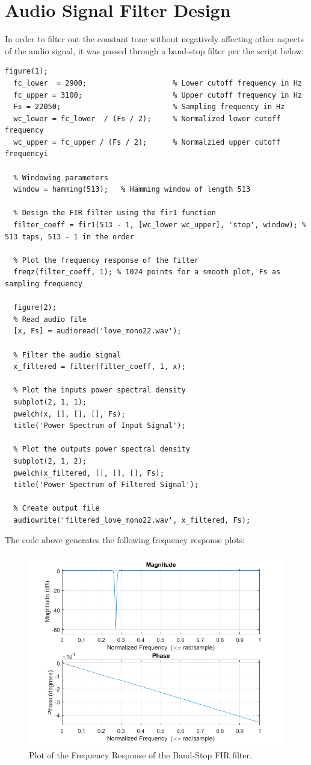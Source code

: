 \documentclass[a4paper, 10pt]{article}
\begin{document}
\section{Audio Signal Filter Design}
In order to filter out the constant tone without negatively affecting other aspects of the audio signal, it was passed through
a band-stop filter per the script below:
\begin{lstlisting}[style=Matlab-editor, basicstyle=\small\ttfamily]
  figure(1);
  fc_lower  = 2900;                    % Lower cutoff frequency in Hz
  fc_upper = 3100;                     % Upper cutoff frequency in Hz
  Fs = 22050;                          % Sampling frequency in Hz
  wc_lower = fc_lower  / (Fs / 2);     % Normalized lower cutoff frequency
  wc_upper = fc_upper / (Fs / 2);      % Normalzied upper cutoff frequencyi

  % Windowing parameters
  window = hamming(513);   % Hamming window of length 513

  % Design the FIR filter using the fir1 function
  filter_coeff = fir1(513 - 1, [wc_lower wc_upper], 'stop', window); % 513 taps, 513 - 1 in the order

  % Plot the frequency response of the filter
  freqz(filter_coeff, 1); % 1024 points for a smooth plot, Fs as sampling frequency

  figure(2);
  % Read audio file
  [x, Fs] = audioread('love_mono22.wav');

  % Filter the audio signal
  x_filtered = filter(filter_coeff, 1, x);

  % Plot the inputs power spectral density
  subplot(2, 1, 1);
  pwelch(x, [], [], [], Fs);
  title('Power Spectrum of Input Signal');

  % Plot the outputs power spectral density
  subplot(2, 1, 2);
  pwelch(x_filtered, [], [], [], Fs);
  title('Power Spectrum of Filtered Signal');

  % Create output file
  audiowrite('filtered_love_mono22.wav', x_filtered, Fs);
\end{lstlisting}
The code above generates the following frequency response plots:
\begin{figure}[H]
  \centering
  \includegraphics[width=13cm]{images/q3_c.png}
  \caption{Plot of the Frequency Response of the Band-Stop FIR filter.}
\end{figure}
\end{document}
